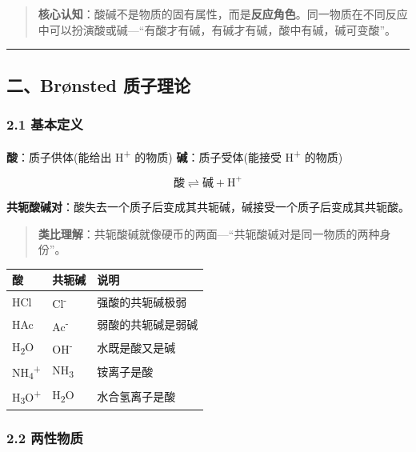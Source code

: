\begin{quote}
\textbf{核心认知}：酸碱不是物质的固有属性，而是\textbf{反应角色}。同一物质在不同反应中可以扮演酸或碱---``有酸才有碱，有碱才有碱，酸中有碱，碱可变酸''。
\end{quote}

\begin{center}\rule{0.5\linewidth}{0.5pt}\end{center}

\subsection{二、Brønsted 质子理论}\label{ux4e8cbruxf8nsted-ux8d28ux5b50ux7406ux8bba}

\subsubsection{2.1 基本定义}\label{ux57faux672cux5b9aux4e49}

\textbf{酸}：质子供体(能给出 H\textsuperscript{+} 的物质)
\textbf{碱}：质子受体(能接受 H\textsuperscript{+} 的物质)

\[
\text{酸} \rightleftharpoons \text{碱} + \mathrm{H}^+
\]

\textbf{共轭酸碱对}：酸失去一个质子后变成其共轭碱，碱接受一个质子后变成其共轭酸。

\begin{quote}
\textbf{类比理解}：共轭酸碱就像硬币的两面---``共轭酸碱对是同一物质的两种身份''。
\end{quote}

{\def\LTcaptype{none} %
\begin{longtable}[]{@{}lll@{}}
\toprule\noalign{}
酸 & 共轭碱 & 说明 \\
\midrule\noalign{}
\endhead
\bottomrule\noalign{}
\endlastfoot
HCl & Cl\textsuperscript{-} & 强酸的共轭碱极弱 \\
HAc & Ac\textsuperscript{-} & 弱酸的共轭碱是弱碱 \\
H\textsubscript{2}O & OH\textsuperscript{-} & 水既是酸又是碱 \\
NH\textsubscript{4}\textsuperscript{+} & NH\textsubscript{3} & 铵离子是酸 \\
H\textsubscript{3}O\textsuperscript{+} & H\textsubscript{2}O & 水合氢离子是酸 \\
\end{longtable}
}

\subsubsection{2.2 两性物质}\label{ux4e24ux6027ux7269ux8d28}

